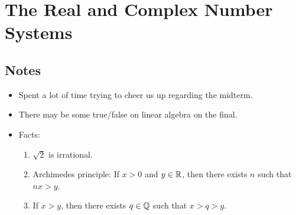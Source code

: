 \documentclass[../../notes.tex]{subfiles}
\begin{document}
\chapter{The Real and Complex Number Systems}
\section{Notes}
\begin{itemize}
    \item {}Spent a lot of time trying to cheer us up regarding the midterm.
    \item There may be some true/false on linear algebra on the final.
    \item Facts:
    \begin{enumerate}
        \item $\sqrt{2}$ is irrational.
        \item Archimedes principle: If $x>0$ and $y\in\mathbb{R}$, then there exists $n$ such that $nx>y$.
        \item If $x>y$, then there exists $q\in\mathbb{Q}$ such that $x>q>y$.
    \end{enumerate}
\end{itemize}
\end{document}
